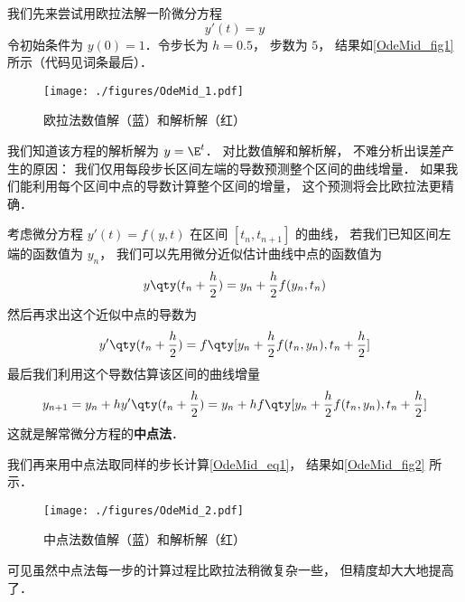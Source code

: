 

我们先来尝试用欧拉法解一阶微分方程
\begin{equation}\label{OdeMid_eq1}
y'(t) = y
\end{equation}
令初始条件为 $y(0) = 1$．令步长为 $h = 0.5$， 步数为 $5$， 结果如\autoref{OdeMid_fig1} 所示（代码见词条最后）．

\begin{figure}[ht]
\centering
\texttt{[image: ./figures/OdeMid\_1.pdf]}
\caption{欧拉法数值解（蓝）和解析解（红）} \label{OdeMid_fig1}
\end{figure}

我们知道该方程的解析解为 $y = \E^{t}$． 对比数值解和解析解， 不难分析出误差产生的原因： 我们仅用每段步长区间左端的导数预测整个区间的曲线增量． 如果我们能利用每个区间中点的导数计算整个区间的增量， 这个预测将会比欧拉法更精确．

考虑微分方程 $y'(t) = f(y, t)$ 在区间 $[t_n, t_{n+1}]$ 的曲线， 若我们已知区间左端的函数值为 $y_n$， 我们可以先用微分近似估计曲线中点的函数值为
\begin{equation}
y \qty(t_n + \frac h2) = y_n + \frac h2 f(y_n, t_n)
\end{equation}
然后再求出这个近似中点的导数为
\begin{equation}
y' \qty(t_n + \frac h2) = f \qty[y_n + \frac h2 f(t_n, y_n), t_n + \frac h2]
\end{equation}
最后我们利用这个导数估算该区间的曲线增量
\begin{equation}
y_{n+1} = y_n + hy' \qty(t_n + \frac h2) = y_n + h f \qty[y_n + \frac h2 f(t_n, y_n), t_n + \frac h2]
\end{equation}
这就是解常微分方程的\textbf{中点法}．

我们再来用中点法取同样的步长计算\autoref{OdeMid_eq1}， 结果如\autoref{OdeMid_fig2} 所示．

\begin{figure}[ht]
\centering
\texttt{[image: ./figures/OdeMid\_2.pdf]}
\caption{中点法数值解（蓝）和解析解（红）} \label{OdeMid_fig2}
\end{figure}

可见虽然中点法每一步的计算过程比欧拉法稍微复杂一些， 但精度却大大地提高了． 

